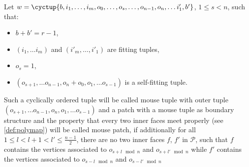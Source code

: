 \begin{definition} Let $w = \cyctup{b, i_1, \dots, i_m, o_0, \dots, o_s, \dots, o_{n - 1}, o_n, \dots i'_1, b'}$, $1 \leq s < n$, such that:
  \begin{itemize}
  \item $b + b' = r - 1$,
  \item $(i_1, \dots i_m)$ and $(i'_m, \dots, i'_1)$ are fitting tuples,
  \item $o_s = 1$,
  \item $(o_{s + 1}, \dots o_{n - 1}, o_n + o_0, o_1, \dots o_{s - 1})$ is a self-fitting tuple.
  \end{itemize}
  Such a cyclically ordered tuple will be called mouse tuple with outer tuple $(o_{s + 1}, \dots o_{n - 1}, o_n, o_1, \dots o_{s - 1})$ and a patch with a mouse tuple as boundary structure and the property that every two inner faces meet properly (see \autoref{def:polymap}) will be called mouse patch, if additionally for all $1 \leq l < l + 1 < l' \leq \frac{n - 1}{2}$, there are no two inner faces $f$, $f'$ in $\mathcal{P}$, such that $f$ contains the vertices associated to $o_{s + l \mod n}$ and $o_{s + l' \mod n}$ while $f'$ contains the vertices associated to $o_{s - l \mod n}$ and $o_{s - l' \mod n}$
\end{definition}

